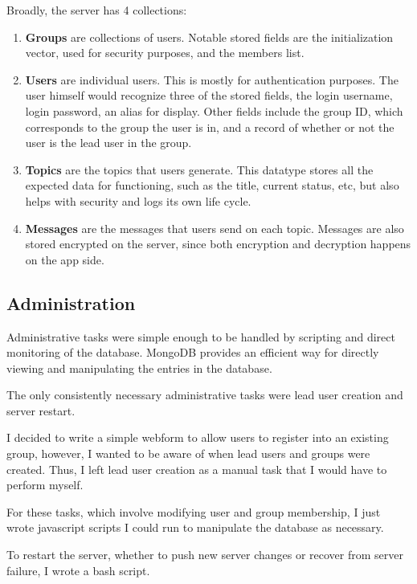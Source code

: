       Broadly, the server has 4 collections:
      \begin{enumerate}
      \item \textbf{Groups} are collections of users.
        Notable stored fields are the initialization vector, used for security purposes,
        and the members list.
      \item \textbf{Users} are individual users.
        This is mostly for authentication purposes.
        The user himself would recognize three of the stored fields,
        the login username, login password, an alias for display.
        Other fields include the group ID, which corresponds to the group the user is in,
        and a record of whether or not the user is the lead user in the group.
      \item \textbf{Topics} are the topics that users generate.
        This datatype stores all the expected data for functioning,
        such as the title, current status, etc,
        but also helps with security and logs its own life cycle.
      \item \textbf{Messages} are the messages that users send on each topic.
        Messages are also stored encrypted on the server,
        since both encryption and decryption happens on the app side.
      \end{enumerate}

    \subsection{Administration}
      Administrative tasks were simple enough to be handled by scripting
      and direct monitoring of the database.
      MongoDB provides an efficient way for directly viewing
      and manipulating the entries in the database.

      The only consistently necessary administrative tasks were lead user creation
      and server restart.

      I decided to write a simple webform to allow users to register
      into an existing group,
      however, I wanted to be aware of when lead users and groups were created.
      Thus, I left lead user creation as a manual task that I would have to
      perform myself.

      For these tasks, which involve modifying user and group membership,
      I just wrote javascript scripts I could run to manipulate the database
      as necessary.

      To restart the server,
      whether to push new server changes or recover from server failure,
      I wrote a bash script.

